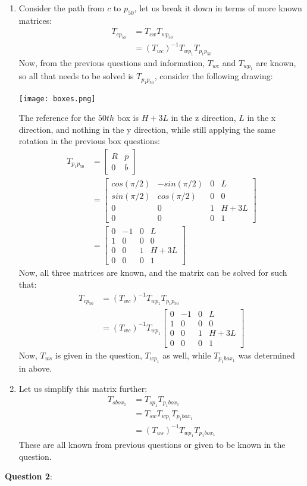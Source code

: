 \documentclass{article}
\begin{document}
\begin{enumerate}
\item
Consider the path from $c$ to $p_{50}$, let us break it down in terms of more known matrices:
\begin{align}
    T_{cp_{50}} &= T_{cw}T_{wp_{50}}\\
    &= (T_{wc})^{-1}T_{wp_1}T_{p_1p_{50}}
\end{align}
Now, from the previous questions and information, $T_{wc}$ and $T_{wp_1}$ are known, so all that needs to be solved is $T_{p_1p_50}$, consider the following drawing:
\begin{center}
            \texttt{[image: boxes.png]}
        \end{center}
The reference for the $50th$ box is $H+3L$ in the z direction, $L$ in the x direction, and nothing in the y direction, while still applying the same rotation in the previous box questions:
\begin{align}
            T_{p_1p_50} &= \begin{bmatrix}
R & p \\
0 & b 
\end{bmatrix}\\
&= \begin{bmatrix}
cos(\pi/2) & -sin(\pi/2)& 0 &  L \\
sin(\pi/2) & cos(\pi/2) & 0 & 0 \\
0 & 0 & 1& H+3L \\
0 & 0 & 0 & 1
\end{bmatrix}\\
&= \begin{bmatrix}
0 & -1& 0 & L \\
1 & 0 & 0 & 0 \\
0 & 0 & 1& H+3L \\
0 & 0 & 0 & 1
\end{bmatrix}
        \end{align}
Now, all three matrices are known, and the matrix can be solved for such that:
\begin{align}
    T_{cp_50} &= (T_{wc})^{-1}T_{wp_1}T_{p_1p_{50}} \\
    &= (T_{wc})^{-1}T_{wp_1}\begin{bmatrix}
0 & -1& 0 & L \\
1 & 0 & 0 & 0 \\
0 & 0 & 1& H+3L \\
0 & 0 & 0 & 1
\end{bmatrix}
\end{align}
Now, $T_{ws}$ is given in the question, $T_{wp_1}$ as well, while $T_{p_1box_1}$ was determined in above.
\item Let us simplify this matrix further:
\begin{align}
    T_{sbox_1} &= T_{sp_1}T_{p_1box_1} \\
    &= T_{sw}T_{wp_1}T_{p_1box_1}\\
    &= (T_{ws})^{-1}T_{wp_1}T_{p_1box_1}
\end{align}
These are all known from previous questions or given to be known in the question.
        \end{enumerate}
\textbf{Question 2}:\\
\end{document}
